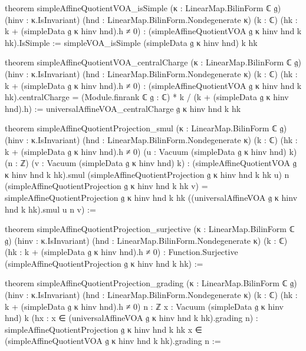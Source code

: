 \begin{leancode}
theorem simpleAffineQuotientVOA_isSimple (κ : LinearMap.BilinForm ℂ 𝔤) (hinv : κ.IsInvariant)
    (hnd : LinearMap.BilinForm.Nondegenerate κ) (k : ℂ) (hk : k + (simpleData 𝔤 κ hinv hnd).h ≠ 0) :
    (simpleAffineQuotientVOA 𝔤 κ hinv hnd k hk).IsSimple :=
  simpleVOA_isSimple (simpleData 𝔤 κ hinv hnd) k hk

theorem simpleAffineQuotientVOA_centralCharge (κ : LinearMap.BilinForm ℂ 𝔤) (hinv : κ.IsInvariant)
    (hnd : LinearMap.BilinForm.Nondegenerate κ) (k : ℂ) (hk : k + (simpleData 𝔤 κ hinv hnd).h ≠ 0) :
    (simpleAffineQuotientVOA 𝔤 κ hinv hnd k hk).centralCharge =
      (Module.finrank ℂ 𝔤 : ℂ) * k / (k + (simpleData 𝔤 κ hinv hnd).h) :=
  universalAffineVOA_centralCharge 𝔤 κ hinv hnd k hk

theorem simpleAffineQuotientProjection_smul (κ : LinearMap.BilinForm ℂ 𝔤) (hinv : κ.IsInvariant)
    (hnd : LinearMap.BilinForm.Nondegenerate κ) (k : ℂ) (hk : k + (simpleData 𝔤 κ hinv hnd).h ≠ 0)
    (u : Vacuum (simpleData 𝔤 κ hinv hnd) k) (n : ℤ) (v : Vacuum (simpleData 𝔤 κ hinv hnd) k) :
    (simpleAffineQuotientVOA 𝔤 κ hinv hnd k hk).smul
        (simpleAffineQuotientProjection 𝔤 κ hinv hnd k hk u) n
        (simpleAffineQuotientProjection 𝔤 κ hinv hnd k hk v) =
      simpleAffineQuotientProjection 𝔤 κ hinv hnd k hk
        ((universalAffineVOA 𝔤 κ hinv hnd k hk).smul u n v) :=

theorem simpleAffineQuotientProjection_surjective (κ : LinearMap.BilinForm ℂ 𝔤)
    (hinv : κ.IsInvariant) (hnd : LinearMap.BilinForm.Nondegenerate κ) (k : ℂ)
    (hk : k + (simpleData 𝔤 κ hinv hnd).h ≠ 0) :
    Function.Surjective (simpleAffineQuotientProjection 𝔤 κ hinv hnd k hk) :=

theorem simpleAffineQuotientProjection_grading (κ : LinearMap.BilinForm ℂ 𝔤)
    (hinv : κ.IsInvariant) (hnd : LinearMap.BilinForm.Nondegenerate κ) (k : ℂ)
    (hk : k + (simpleData 𝔤 κ hinv hnd).h ≠ 0) {n : ℤ} {x : Vacuum (simpleData 𝔤 κ hinv hnd) k}
    (hx : x ∈ (universalAffineVOA 𝔤 κ hinv hnd k hk).grading n) :
    simpleAffineQuotientProjection 𝔤 κ hinv hnd k hk x ∈
      (simpleAffineQuotientVOA 𝔤 κ hinv hnd k hk).grading n :=
\end{leancode}

